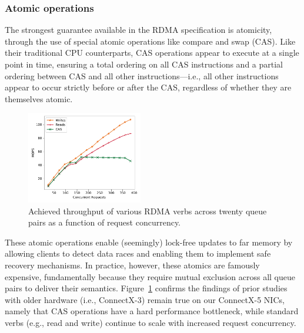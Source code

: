 \subsubsection{Atomic operations}

The strongest guarantee available in the RDMA specification is
atomicity, through the use of special atomic operations like compare
and swap (CAS).  Like their traditional CPU counterparts, CAS
operations appear to execute at a single point in time, ensuring a
total ordering on all CAS instructions and a partial ordering between
CAS and all other instructions---i.e., all other instructions appear
to occur strictly before or after the CAS, regardless of whether they
are themselves atomic.

\begin{figure}[t]
    \includegraphics[width=0.45\textwidth]{fig/rdma_concur.pdf}
    \caption{Achieved throughput of various RDMA verbs across twenty queue pairs as a function of request concurrency.}
    \label{fig:rdma_concur}
\end{figure}

These atomic operations enable (seemingly) lock-free updates to far
memory by allowing clients to detect data races and enabling them to
implement safe recovery mechanisms. In practice, however, these
atomics are famously~\cite{design-guidelines,clover} expensive,
fundamentally because they require mutual exclusion across all queue
pairs to deliver their semantics.  Figure~\ref{fig:rdma_concur}
confirms the findings of prior
studies~\cite[Fig. 14]{design-guidelines} with older hardware (i.e.,
ConnectX-3) remain true on our ConnectX-5 NICs, namely that CAS
operations have a hard performance bottleneck, while standard verbs
(e.g., read and write) continue to scale with increased request
concurrency.

